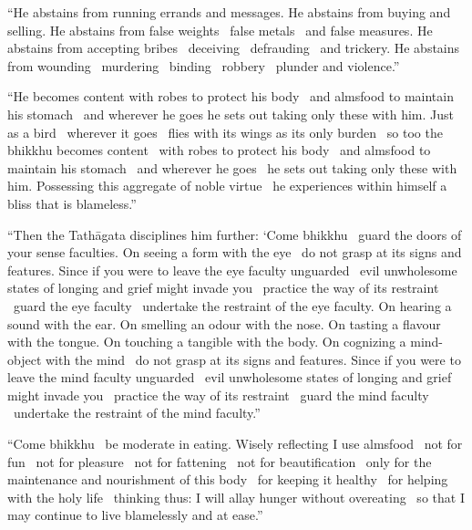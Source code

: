 \begin{justify}
  “He abstains from running errands and messages. He abstains from buying and selling. He abstains from false weights \breathmark\ false metals \breathmark\ and false measures. He abstains from accepting bribes \breathmark\ deceiving \breathmark\ defrauding \breathmark\ and trickery. He abstains from wounding \breathmark\ murdering \breathmark\ binding \breathmark\ robbery \breathmark\ plunder and violence.”
\end{justify}

\begin{justify}
  “He becomes content with robes to protect his body \breathmark\ and almsfood to maintain his stomach \breathmark\ and wherever he goes he sets out taking only these with him. Just as a bird \breathmark\ wherever it goes \breathmark\ flies with its wings as its only burden \breathmark\ so too the bhikkhu becomes content \breathmark\ with robes to protect his body \breathmark\ and almsfood to maintain his stomach \breathmark\ and wherever he goes \breathmark\ he sets out taking only these with him. Possessing this aggregate of noble virtue \breathmark\ he experiences within himself a bliss that is blameless.”
\end{justify}

\suttaRef{[MN 51]}

\begin{justify}
  “Then the Tathāgata disciplines him further: ‘Come bhikkhu \breathmark\ guard the doors of your sense faculties. On seeing a form with the eye \breathmark\ do not grasp at its signs and features. Since if you were to leave the eye faculty unguarded \breathmark\ evil unwholesome states of longing and grief might invade you \breathmark\ practice the way of its restraint \breathmark\ guard the eye faculty \breathmark\ undertake the restraint of the eye faculty. On hearing a sound with the ear. On smelling an odour with the nose. On tasting a flavour with the tongue. On touching a tangible with the body. On cognizing a mind-object with the mind \breathmark\ do not grasp at its signs and features. Since if you were to leave the mind faculty unguarded \breathmark\ evil unwholesome states of longing and grief might invade you \breathmark\ practice the way of its restraint \breathmark\ guard the mind faculty \breathmark\ undertake the restraint of the mind faculty.”
\end{justify}

\begin{justify}
  “Come bhikkhu \breathmark\ be moderate in eating. Wisely reflecting I use almsfood \breathmark\ not for fun \breathmark\ not for pleasure \breathmark\ not for fattening \breathmark\ not for beautification \breathmark\ only for the maintenance and nourishment of this body \breathmark\ for keeping it healthy \breathmark\ for helping with the holy life \breathmark\ thinking thus: I will allay hunger without overeating \breathmark\ so that I may continue to live blamelessly and at ease.”
\end{justify}

